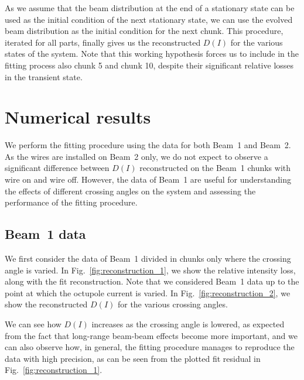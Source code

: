 As we assume that the beam distribution at the end of a stationary state can be used as the initial condition of the next stationary state, we can use the evolved beam distribution as the initial condition for the next chunk. This procedure, iterated for all parts, finally gives us the reconstructed $D(I)$ for the various states of the system. Note that this working hypothesis forces us to include in the fitting process also chunk 5 and chunk 10, despite their significant relative losses in the transient state.

\section{Numerical results}\label{sec:5:results}

We perform the fitting procedure using the data for both Beam~1 and Beam~2. As the wires are installed on Beam~2 only, we do not expect to observe a significant difference between $D(I)$ reconstructed on the Beam~1 chunks with wire on and wire off. However, the data of Beam~1 are useful for understanding the effects of different crossing angles on the system and assessing the performance of the fitting procedure.

\subsection*{Beam~1 data}

We first consider the data of Beam~1 divided in chunks only where the crossing angle is varied. In Fig.~\ref{fig:reconstruction_1}, we show the relative intensity loss, along with the fit reconstruction. Note that we considered Beam~1 data up to the point at which the octupole current is varied. In Fig.~\ref{fig:reconstruction_2}, we show the reconstructed $D(I)$ for the various crossing angles.

We can see how $D(I)$ increases as the crossing angle is lowered, as expected from the fact that long-range beam-beam effects become more important, and we can also observe how, in general, the fitting procedure manages to reproduce the data with high precision, as can be seen from the plotted fit residual in Fig.~\ref{fig:reconstruction_1}. %


